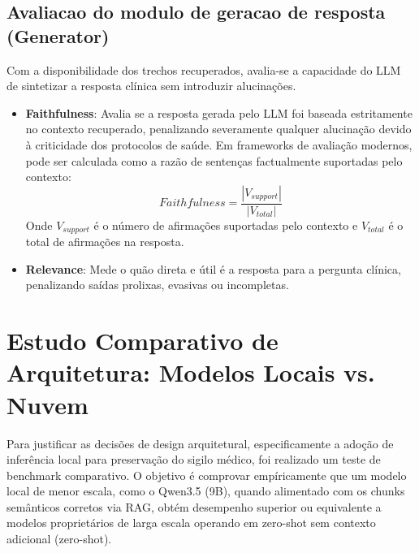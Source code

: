 \documentclass[12pt]{article}
\begin{document}
\subsection{Avaliacao do modulo de geracao de resposta (Generator)}
Com a disponibilidade dos trechos recuperados, avalia-se a capacidade do LLM de sintetizar a resposta clínica sem introduzir alucinações.

\begin{itemize}
  \item \textbf{Faithfulness}: Avalia se a resposta gerada pelo LLM foi baseada estritamente no contexto recuperado, penalizando severamente qualquer alucinação devido à criticidade dos protocolos de saúde.
  Em frameworks de avaliação modernos, pode ser calculada como a razão de sentenças factualmente suportadas pelo contexto:
  \begin{equation}
    Faithfulness = \frac{|V_{support}|}{|V_{total}|}
  \end{equation}
  Onde $V_{support}$ é o número de afirmações suportadas pelo contexto e $V_{total}$ é o total de afirmações na resposta.

  \item \textbf{Relevance}: Mede o quão direta e útil é a resposta para a pergunta clínica, penalizando saídas prolixas, evasivas ou incompletas.
  \begin{equation}
  \end{equation}
\end{itemize}

\section{Estudo Comparativo de Arquitetura: Modelos Locais vs. Nuvem}
Para justificar as decisões de design arquitetural, especificamente a adoção de inferência local para preservação do sigilo médico, foi realizado um teste de benchmark comparativo.
O objetivo é comprovar empíricamente que um modelo local de menor escala, como o Qwen3.5 (9B), quando alimentado com os chunks semânticos corretos via RAG, obtém desempenho superior ou equivalente a modelos proprietários de larga escala operando em zero-shot sem contexto adicional (zero-shot).
\end{document}
